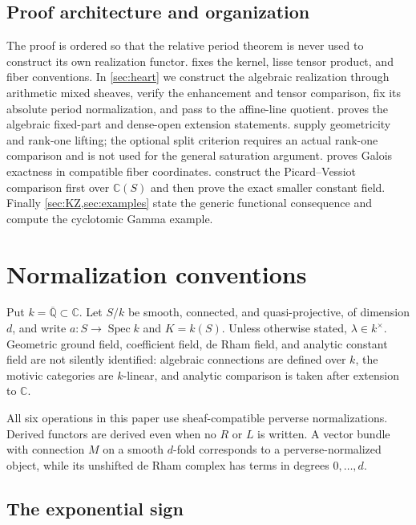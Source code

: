 \documentclass[11pt]{article}
\numberwithin{equation}{section}
\theoremstyle{definition}
\theoremstyle{remark}
\newcommand{\Q}{\mathbb Q}
\newcommand{\C}{\mathbb C}
\newcommand{\Spec}{\operatorname{Spec}}
\begin{document}
\subsection{Proof architecture and organization}

The proof is ordered so that the relative period theorem is never used to
construct its own realization functor.  fixes the
kernel, lisse tensor product, and fiber conventions. In \cref{sec:heart}
we construct the algebraic realization through arithmetic mixed sheaves,
verify the enhancement and tensor comparison, fix its absolute period
normalization, and pass to the affine-line quotient.  proves the algebraic fixed-part
and dense-open extension statements. 
supply geometricity and rank-one lifting; the optional split criterion
requires an actual rank-one comparison and is not used for the general
saturation argument.  proves Galois exactness in compatible
fiber coordinates.  construct the
Picard--Vessiot comparison first over $\C(S)$ and then prove the exact
smaller constant field. Finally \cref{sec:KZ,sec:examples} state the generic
functional consequence and compute the cyclotomic Gamma example.

\section{Normalization conventions}\label{sec:normalization}\label{sec:background}

Put $k=\overline{\Q}\subset\C$. Let $S/k$ be smooth, connected, and
quasi-projective, of dimension $d$, and write $a:S\to\Spec k$ and
$K=k(S)$. Unless otherwise stated, $\lambda\in k^\times$. Geometric ground
field, coefficient field, de Rham field, and analytic constant field are not
silently identified: algebraic connections are defined over $k$, the
motivic categories are $k$-linear, and analytic comparison is taken after
extension to $\C$.

All six operations in this paper use sheaf-compatible perverse
normalizations. Derived functors are derived even when no $R$ or $L$ is
written. A vector bundle with connection $M$ on a smooth $d$-fold corresponds
to a perverse-normalized object, while its unshifted de Rham complex has
terms in degrees $0,\ldots,d$.

\subsection{The exponential sign}
\end{document}
